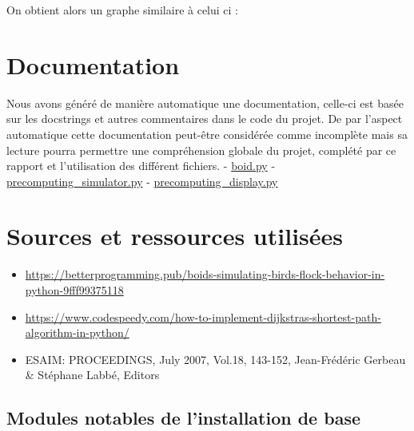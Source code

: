 \documentclass[
]{article}
\providecommand{\tightlist}{%
  \setlength{\itemsep}{0pt}\setlength{\parskip}{0pt}}
\begin{document}
On obtient alors un graphe similaire à celui ci :

\hypertarget{documentation}{%
\section{Documentation}\label{documentation}}

Nous avons généré de manière automatique une documentation, celle-ci est
basée sur les docstrings et autres commentaires dans le code du projet.
De par l'aspect automatique cette documentation peut-être considérée
comme incomplète mais sa lecture pourra permettre une compréhension
globale du projet, complété par ce rapport et l'utilisation des
différent fichiers. -
\href{https://htmlpreview.github.io/?https://github.com/Polarolouis/BoidSimulation/blob/9927037af0fde6ff9ab84311d5ce114de85f5d35/html/boid.html}{boid.py}
-
\href{https://htmlpreview.github.io/?https://github.com/Polarolouis/BoidSimulation/blob/9927037af0fde6ff9ab84311d5ce114de85f5d35/html/precomputing_simulator.html}{precomputing\_simulator.py}
-
\href{https://htmlpreview.github.io/?https://github.com/Polarolouis/BoidSimulation/blob/9927037af0fde6ff9ab84311d5ce114de85f5d35/html/precomputing_display.html}{precomputing\_display.py}

\hypertarget{sources-et-ressources-utilisuxe9es}{%
\section{Sources et ressources
utilisées}\label{sources-et-ressources-utilisuxe9es}}

\begin{itemize}
\tightlist
\item
  \url{https://betterprogramming.pub/boids-simulating-birds-flock-behavior-in-python-9fff99375118}
\item
  \url{https://www.codespeedy.com/how-to-implement-dijkstras-shortest-path-algorithm-in-python/}
\item
  ESAIM: PROCEEDINGS, July 2007, Vol.18, 143-152, Jean-Frédéric Gerbeau
  \& Stéphane Labbé, Editors
\end{itemize}

\hypertarget{modules-notables-de-linstallation-de-base}{%
\subsection{Modules notables de l'installation de
base}\label{modules-notables-de-linstallation-de-base}}
\end{document}
